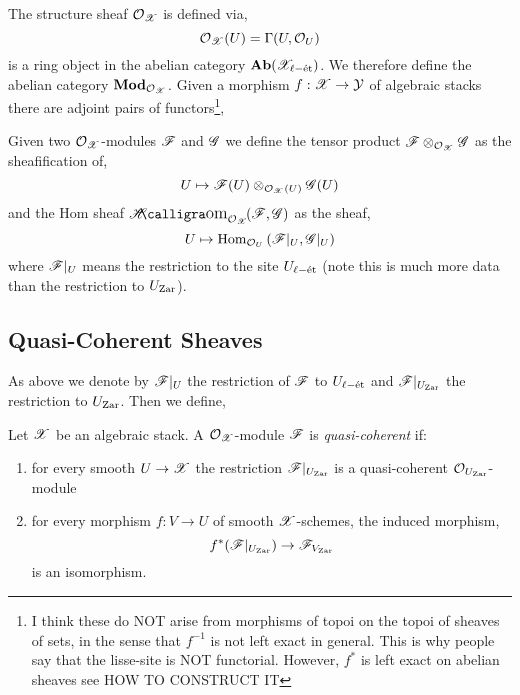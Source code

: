 \documentclass[12pt]{article}
\begin{document}
\begin{defn}
The structure sheaf $\mathcal{O}_{\mathscr{X}}$ is defined via,
\[ \mathcal{O}_{\mathscr{X}}(U) = \Gamma(U, \mathcal{O}_{U}) \]
is a ring object in the abelian category $\mathbf{Ab}(\mathscr{X}_{\ell-\text{\'{e}t}})$. We therefore define the abelian category $\mathbf{Mod}_{\mathcal{O}_{\mathscr{X}}}$. Given a morphism $f : \mathscr{X} \to \mathcal{Y}$ of algebraic stacks there are adjoint pairs of functors\footnote{I think these do NOT arise from morphisms of topoi on the topoi of sheaves of sets, in the sense that $f^{-1}$ is not left exact in general. This is why people say that the lisse-\etale site is NOT functorial. However, $f^*$ is left exact on abelian sheaves see  {\color{red} HOW TO CONSTRUCT IT}},
\begin{center}
\end{center}
Given two $\mathcal{O}_{\mathscr{X}}$-modules $\mathscr{F}$ and $\mathscr{G}$ we define the tensor product $\mathscr{F} \otimes_{\mathcal{O}_{\mathscr{X}}} \mathscr{G}$ as the sheafification of,
\[ U \mapsto \mathscr{F}(U) \otimes_{\mathcal{O}_{\mathscr{X}}(U)} \mathscr{G}(U) \]
and the Hom sheaf $\shHom{\struct{\X}}{\F}{\G}$ as the sheaf,
\[ U \mapsto \mathrm{Hom}_{\mathcal{O}_{U}} \left( \mathscr{F}|_U, \mathscr{G}|_U \right) \]
where $\mathscr{F}|_U$ means the restriction to the site $U_{\ell-\text{\'{e}t}}$ (note this is much more data than the restriction to $U_{\mathrm{Zar}}$). 
\end{defn}

\subsection{Quasi-Coherent Sheaves}

As above we denote by $\mathscr{F}|_U$ the restriction of $\mathscr{F}$ to $U_{\ell-\text{\'{e}t}}$ and $\mathscr{F}|_{U_{\mathrm{Zar}}}$ the restriction to $U_{\mathrm{Zar}}$. Then we define,

\begin{defn}
Let $\mathscr{X}$ be an algebraic stack. A $\mathcal{O}_{\mathscr{X}}$-module $\mathscr{F}$ is \textit{quasi-coherent} if:
\begin{enumerate}
\item for every smooth $U \to \mathscr{X}$ the restriction $\mathscr{F}|_{U_{\mathrm{Zar}}}$ is a quasi-coherent $\mathcal{O}_{U_{\mathrm{Zar}}}$-module
\item for every morphism $f : V \to U$ of smooth $\mathscr{X}$-schemes, the induced morphism,
\[ f^* (\mathscr{F}|_{U_{\mathrm{Zar}}}) \to \mathscr{F}_{V_{\mathrm{Zar}}} \]
is an isomorphism.
\end{enumerate}
\end{defn} 
\end{document}
